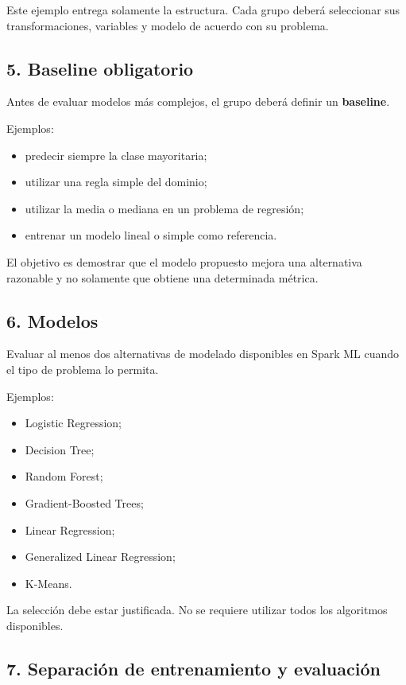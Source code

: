 \documentclass[11pt,a4paper]{article}
\begin{document}
Este ejemplo entrega solamente la estructura. Cada grupo deberá seleccionar sus
transformaciones, variables y modelo de acuerdo con su problema.

\subsection{5. Baseline obligatorio}

Antes de evaluar modelos más complejos, el grupo deberá definir un \textbf{baseline}.

Ejemplos:

\begin{itemize}
  \item predecir siempre la clase mayoritaria;
  \item utilizar una regla simple del dominio;
  \item utilizar la media o mediana en un problema de regresión;
  \item entrenar un modelo lineal o simple como referencia.
\end{itemize}

El objetivo es demostrar que el modelo propuesto mejora una alternativa razonable y no
solamente que obtiene una determinada métrica.

\subsection{6. Modelos}

Evaluar al menos dos alternativas de modelado disponibles en Spark ML cuando el tipo de
problema lo permita.

Ejemplos:

\begin{itemize}
  \item Logistic Regression;
  \item Decision Tree;
  \item Random Forest;
  \item Gradient-Boosted Trees;
  \item Linear Regression;
  \item Generalized Linear Regression;
  \item K-Means.
\end{itemize}

La selección debe estar justificada. No se requiere utilizar todos los algoritmos
disponibles.

\subsection{7. Separación de entrenamiento y evaluación}
\end{document}
